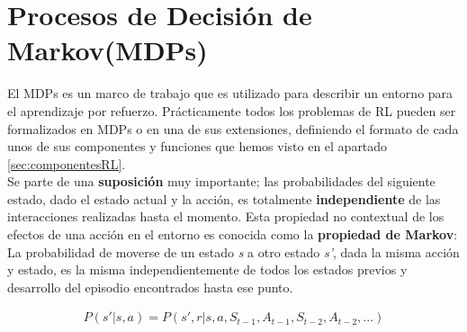\documentclass[11pt,fleqn]{book} %
\begin{document}
%
%	

\section{Procesos de Decisión de Markov(MDPs)}\label{sec:markov}

El MDPs es un marco de trabajo que es utilizado para describir un entorno para el aprendizaje por refuerzo. Prácticamente todos los problemas de RL pueden ser formalizados en MDPs o en una de sus extensiones, definiendo el formato de cada unos de sus componentes y funciones que hemos visto en el apartado \ref{sec:componentesRL}. \\

Se parte de una \textbf{suposición} muy importante; las probabilidades del siguiente estado, dado el estado actual y la acción, es totalmente \textbf{independiente} de las interacciones realizadas hasta el momento. Esta propiedad no contextual de los efectos de una acción en el entorno es conocida como la \textbf{propiedad de Markov}: La probabilidad de moverse de un estado \textit{s} a otro estado \textit{s'}, dada la misma acción y estado, es la misma independientemente de todos los estados previos y desarrollo del episodio encontrados hasta ese punto.

\begin{align*}
P(s'|s,a)=P(s',r|s,a,S_{t-1},A_{t-1},S_{t-2},A_{t-2},...)
\end{align*}
\end{document}
